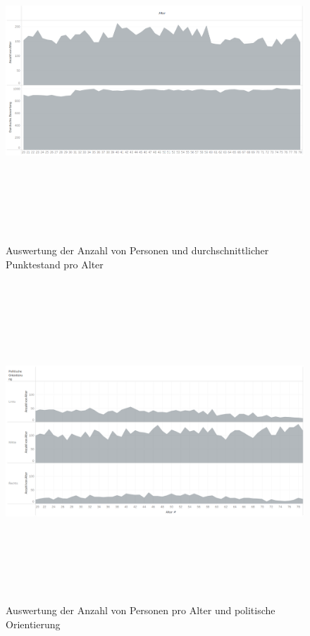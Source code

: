\documentclass[a4paper,12pt]{report}
\begin{document}
\begin{figure}[!h]
    \centering
    \includegraphics[width=16cm,height=12cm]{Diagramme/SZ2_Tab2.PNG}
    \caption{Auswertung der Anzahl von Personen und durchschnittlicher Punktestand pro Alter}
    \label{fig:SZ2Tab2}
\end{figure}

\begin{figure}[!h]
    \centering
    \includegraphics[width=16cm,height=12cm]{Diagramme/SZ2_Tab3.PNG}
    \caption{Auswertung der Anzahl von Personen pro Alter und politische Orientierung}
    \label{fig:SZ2Tab3}
\end{figure}
\end{document}
